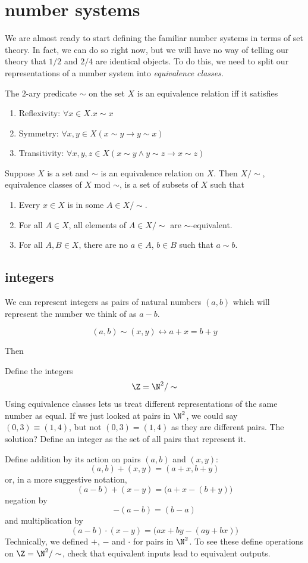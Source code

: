 \documentclass{scrbook}
\renewcommand{\implies}{\to}
\renewcommand{\iff}{\leftrightarrow}
\begin{document}
\section[Number systems]{number systems}
We are almost ready to start defining the familiar number systems in terms of set theory. In fact, we can do so right now, but we will have no way of telling our theory that $1/2$ and $2/4$ are identical objects. To do this, we need to split our representations of a number system into \emph{equivalence classes}. 
\begin{defn}
  The $2$-ary predicate $\sim$ on the set $X$ is an equivalence relation iff it satisfies
  \begin{enumerate}
  \item Reflexivity: $\forall x \in X.x\sim x$
  \item Symmetry: $\forall x,y\in X (x\sim y \implies y\sim x)$
  \item Transitivity: $\forall x,y,z\in X (x\sim y \wedge y\sim z\implies x\sim z)$
  \end{enumerate}
\end{defn}
\begin{defn}
  Suppose $X$ is a set and $\sim$ is an equivalence relation on $X$. Then $X/\sim$, equivalence classes of $X$ mod $\sim$, is a set of subsets of $X$ such that 
  \begin{enumerate}
  \item Every $x\in X$ is in some $A \in X/\sim$. 
  \item For all $A\in X$, all elements of $A\in X/\sim$ are $\sim$-equivalent.
  \item For all $A,B\in X$, there are no $a\in A$, $b\in B$ such that $a\sim b$. 
  \end{enumerate}
\end{defn}
\subsection[Integers]{integers}
We can represent integers as pairs of natural numbers $(a,b)$ which will represent the number we think of as $a-b$. 
\begin{defn}[\sim]
  \[
  (a,b)\sim(x,y) \iff a+x=b+y
  \]
\end{defn}
Then 
\begin{defn}[$\Z$]
  Define the integers
  \[
  \Z=\N^2/\sim
  \]
  Using equivalence classes lets us treat different representations of the same number as equal. If we just looked at pairs in $\N^2$, we could say $(0,3)\equiv (1,4)$, but not $(0,3)=(1,4)$ as they are different pairs. The solution? Define an integer as the set of all pairs that represent it. 

  Define addition by its action on pairs $(a,b)$ and $(x,y)$:
  \[
  (a,b)+(x,y)=(a+x,b+y)
  \]
  or, in a more suggestive notation, 
  \[
  (a-b)+(x-y)=\bigl(a+x-(b+y)\bigr)
  \]
  negation by
  \[
  -(a-b)=(b-a)
  \]
  and multiplication by
  \[
  (a - b)\cdot(x-y)=\bigl(ax +by - (ay+bx)\bigr)
  \]
  Technically, we defined $+$, $-$ and $\cdot$ for pairs in $\N^2$. To see these define operations on $\Z=\N^2/\sim$, check that equivalent inputs lead to equivalent outputs. 
\end{defn}
\end{document}
